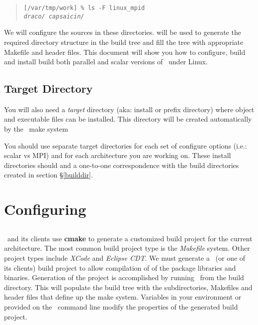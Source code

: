 \begin{verse}
\texttt{[/var/tmp/work] \% ls -F linux\_mpid \\
\emph{draco/  capsaicin/}}
\end{verse}
\normalsize

We will configure the sources in these directories.  
will be used to generate the required directory structure in the build
tree and fill the tree with appropriate Makefile and header files.
This document will show you how to configure, build and install build
both parallel and scalar versions of \draco\ under Linux.

\subsection{Target Directory}

You will also need a \emph{target} directory (aka: install or prefix
directory) where object and executable files can be installed.  This
directory will be created automatically by the \draco\ make system

You should use separate target directories for each set of configure
options (i.e.: scalar vs MPI) and for each architecture you are
working on.  These install directories should and a one-to-one
correspondence with the build directories created in section
\S\ref{builddir}.


\section{Configuring}
\label{configure}

\subsection{\draco}

\draco\ and its clients use \textbf{cmake} to generate a customized
build project for the current architecture.  The most common build
project type is the \textit{Makefile} system.  Other project types
include \textit{XCode} and \textit{Eclipse CDT}.  We must generate a
\draco\ (or one of its clients) build project to allow compilation of
of the package libraries and binaries.  Generation of the project is
accomplished by running \cmake\ from the build directory.  This will
populate the build tree with the subdirectories, Makefiles and header
files that define up the make system.  Variables in your environment
or provided on the \cmake\ command line modify the properties of the
generated build project.

